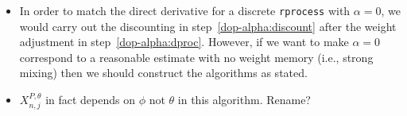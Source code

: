 \documentclass[12p]{article}
\newcommand\code[1]{\texttt{#1}}
\begin{document}
\begin{itemize}
\item In order to match the direct derivative for a discrete \code{rprocess} with $\alpha=0$, we would carry out the discounting in step~\ref{dop-alpha:discount} after the weight adjustment in step~\ref{dop-alpha:dproc}.
  However, if we want to make $\alpha=0$ correspond to a reasonable estimate with no weight memory (i.e., strong mixing) then we should construct the algorithms as stated.
\item ${X}_{n,j}^{P,\theta}$ in fact depends on $\phi$ not $\theta$ in this algorithm. Rename?
\end{itemize}
\end{document}
